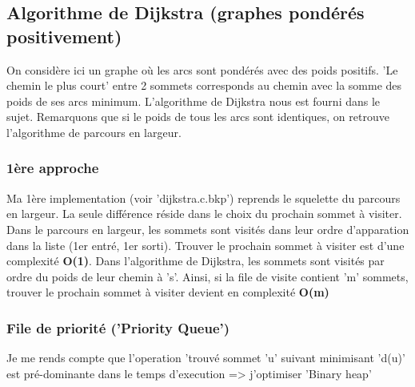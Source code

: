 \documentclass[a4paper,10pt]{article}
\begin{document}
  \subsection{Algorithme de Dijkstra (graphes pondérés positivement)}
    On considère ici un graphe où les arcs sont pondérés avec des poids positifs.\newline
    'Le chemin le plus court' entre 2 sommets corresponds au chemin avec la somme des poids de ses arcs minimum.\newline
     L'algorithme de Dijkstra nous est fourni dans le sujet. Remarquons que si le poids de tous les arcs sont identiques,
     on retrouve l'algorithme de parcours en largeur.
    \subsubsection{1ère approche}
      Ma 1ère implementation (voir 'dijkstra.c.bkp') reprends le squelette du parcours en largeur.
      La seule différence réside dans le choix du prochain sommet à visiter.\newline
      Dans le parcours en largeur, les sommets sont visités dans leur ordre d'apparation dans la liste (1er entré, 1er sorti).
      Trouver le prochain sommet à visiter est d'une complexité \textbf{O(1)}.\newline\newline
      Dans l'algorithme de Dijkstra, les sommets sont visités par ordre du poids de leur chemin à 's'.
      Ainsi, si la file de visite contient 'm' sommets, trouver le prochain sommet à visiter devient en complexité \textbf{O(m)}
    \subsubsection{File de priorité ('Priority Queue')}
      Je me rends compte que l'operation 'trouvé sommet 'u' suivant minimisant 'd(u)' est pré-dominante dans le temps d'execution => j'optimiser
      'Binary heap'
\end{document}
